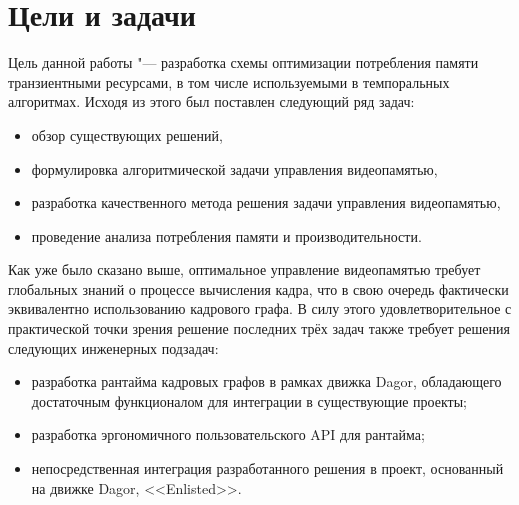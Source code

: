 \section{Цели и задачи}
Цель данной работы "--- разработка схемы оптимизации потребления памяти транзиентными ресурсами, в том числе используемыми в темпоральных алгоритмах. Исходя из этого был поставлен следующий ряд задач:
\begin{itemize}
    \item обзор существующих решений,
    \item формулировка алгоритмической задачи управления видеопамятью,
    \item разработка качественного метода решения задачи управления видеопамятью,
    \item проведение анализа потребления памяти и производительности.
\end{itemize}
Как уже было сказано выше, оптимальное управление видеопамятью требует глобальных знаний о процессе вычисления кадра, что в свою очередь фактически эквивалентно использованию кадрового графа.
В силу этого удовлетворительное с практической точки зрения решение последних трёх задач также требует решения следующих инженерных подзадач:
\begin{itemize}
    \item разработка рантайма кадровых графов в рамках движка Dagor, обладающего достаточным функционалом для интеграции в существующие проекты;
    \item разработка эргономичного пользовательского API для рантайма;
    \item непосредственная интеграция разработанного решения в проект, основанный на движке Dagor, <<Enlisted>>.
\end{itemize}
